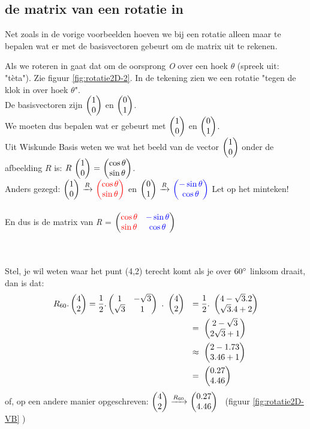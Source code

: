 \subsection{de matrix van een rotatie in \RT}
Net zoals in de vorige voorbeelden hoeven we bij een rotatie alleen maar te bepalen wat er met de basisvectoren gebeurt om de matrix uit te rekenen. 


Als we roteren in \RT gaat dat om de oorsprong \textit{O} over een hoek $\theta$ (spreek uit: "tèta"). Zie figuur  \ref{fig:rotatie2D-2}. In de tekening zien we een rotatie "tegen de klok in over hoek $\theta$". \\De basisvectoren zijn $ \vectwee{1}{0}   $ en   $ \vectwee{0}{1}   $. \\We moeten dus bepalen wat er gebeurt met $ \vectwee{1}{0}   $ en   $ \vectwee{0}{1}   $.\\
Uit Wiskunde Basis weten we wat het beeld van de vector $\vectwee{1}{0} $ onder de afbeelding $R$ is: $ R \ \vectwee{1}{0}  \  = \  \vectwee{\cos \theta}{\sin \theta} $. \\ Anders gezegd:
$ \vectwee{1}{0}   \  \xrightarrow{R}  \ \vectwee[red]{\cos \theta}{\sin \theta} $  \quad en  \quad 
$ \vectwee{0}{1}   \  \xrightarrow{R}  \ \vectwee[blue]{-\sin \theta}{\cos \theta} $  \quad Let op het minteken!\\ \\
En dus is de matrix van \textit{R} =  
$  \begin{pmatrix}  {\color{red}\cos \theta} & {\color{blue}-\sin \theta}  \\  {\color{red}\sin \theta} & {\color{blue}\cos \theta} \end{pmatrix} $\\ \\ \\


Stel, je wil weten waar het punt (4,2) terecht komt als je over  $ 60 \degree$ linksom draait, dan is dat:
\begin{align*}
R_{60} . \mattwee{4}{2} 
=\frac{1}{2} . \mattwee{1 & -\sqrt{3} }{\sqrt{3} & 1} \ . \  \mattwee{4}{2}  \ \ 
& = \frac{1}{2}.\  \mattwee{4  - \sqrt{3}.2 }    { \sqrt{3}.4 + 2} \\ 
& = \  \mattwee{2-\sqrt{3}}{2\sqrt{3}+1} \\ 
& \approx \  \mattwee{2-1.73}{3.46+1}  \\ 
&= \  \mattwee{0.27}{4.46}  
\end{align*}
of, op een andere manier opgeschreven: 
$ \vectwee{4}{2}   \  \xrightarrow{R_{60}}  \ \vectwee{0.27}{4.46} $ \ (figuur \ref{fig:rotatie2D-VB}  )

